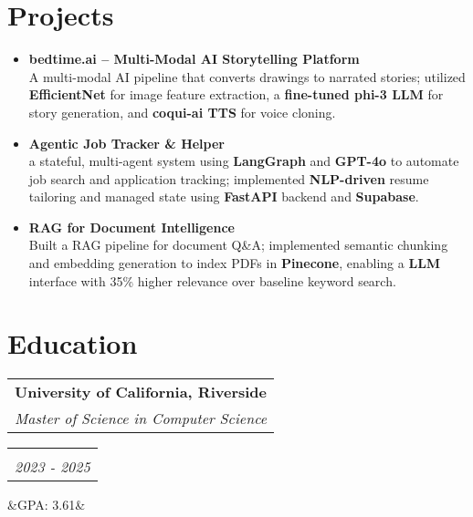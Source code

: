 \documentclass[11pt,a4paper,sans]{moderncv}
\makeatletter
\newcommand*{\customcventry}[7][.13em]{
\begin{tabular}{@{}l}
{\bfseries #4} \\
{\itshape #3}
\end{tabular}
\hfill
\begin{tabular}{l@{}}
{\bfseries #5} \\
{\itshape #2}
\end{tabular}
\ifx&#7&%
\else{%
\begin{minipage}{\maincolumnwidth}%
\small#7%
\end{minipage}}\fi%
\par\addvspace{#1}}
\makeatother
\begin{document}
\section{Projects}
\begin{itemize}[leftmargin=0.6cm, label={\textbullet}]
    \item \textbf{bedtime.ai – Multi-Modal AI Storytelling Platform} \\
    A multi-modal AI pipeline that converts drawings to narrated stories; utilized \textbf{EfficientNet} for image feature extraction, a \textbf{fine-tuned phi-3 LLM} for story generation, and \textbf{coqui-ai TTS} for voice cloning.
        
    \item \textbf{Agentic Job Tracker \& Helper} \\
    a stateful, multi-agent system using \textbf{LangGraph} and \textbf{GPT-4o} to automate job search and application tracking; implemented \textbf{NLP-driven} resume tailoring and managed state using \textbf{FastAPI} backend and \textbf{Supabase}.
    
    \item \textbf{RAG for Document Intelligence} \\
    Built a RAG pipeline for document Q\&A; implemented semantic chunking and embedding generation to index PDFs in \textbf{Pinecone}, enabling a \textbf{LLM} interface with 35\% higher relevance over baseline keyword search.

\end{itemize}


\section{Education}
\customcventry{2023 - 2025}{Master of Science in Computer Science}{University of California, Riverside}{}{}{GPA: 3.61}
\end{document}
